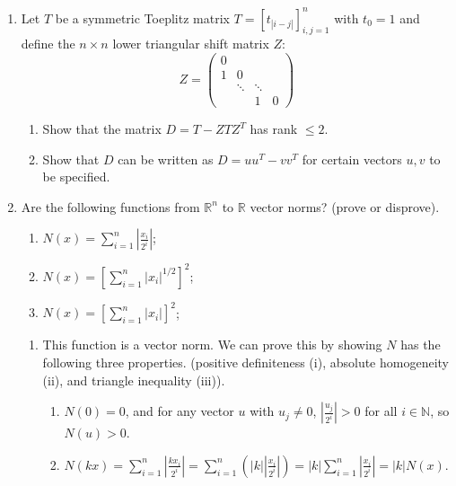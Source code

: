 \documentclass[11pt]{article}
\newcommand{\R}{\mathbb{R}}
\newcommand{\N}{\mathbb{N}}
\begin{document}
\begin{enumerate}
	\item Let \(T\) be a symmetric Toeplitz matrix \(T = [t_{|i-j|}]^n_{i,j=1}\) with \(t_0 = 1\) and define the \(n \times n\) lower triangular shift matrix \(Z\):
	      \[Z = \begin{pmatrix} 0 & & & \\ 1 & 0 & & \\ & \ddots & \ddots & \\ & & 1 & 0 \end{pmatrix}\]
	      \begin{enumerate}[label=(\alph*)]
		      \item Show that the matrix \(D = T - ZTZ^T\) has rank \(\leq 2\).
		      \item Show that \(D\) can be written as \(D = uu^T - vv^T\) for certain vectors \(u,v\) to be specified.
	      \end{enumerate}

	\item Are the following functions from \(\R^n\) to \(\R\) vector norms? (prove or disprove).
	      \begin{multicols}{3}
		      \begin{enumerate}[label=(\alph*)]
			      \item \(N(x) = \displaystyle\sum_{i=1}^n \left| \frac{x_i}{2^i} \right|\);
			      \item \(N(x) = \left[ \displaystyle\sum_{i=1}^n |x_i|^{1/2} \right]^2\);
			      \item \(N(x) = \left[ \displaystyle\sum_{i=1}^n |x_i| \right]^2\);
		      \end{enumerate}
	      \end{multicols}
	      \begin{enumerate}[label=(\alph*)]
		      \item This function is a vector norm.  We can prove this by showing \(N\) has the following three properties. (positive definiteness (i), absolute homogeneity (ii), and triangle inequality (iii)).
		            \begin{enumerate}
			            \item \(N(0)=0\), and for any vector \(u\) with \(u_j \neq 0\), \(\left| \displaystyle\frac{u_j}{2^i} \right| > 0\) for all \(i \in \N\), so \(N(u) > 0\).

			            \item \(N(kx) = \displaystyle\sum_{i=1}^{n} \left| \frac{kx_i}{2^i} \right| = \sum_{i=1}^n \left(|k|\left| \frac{x_i}{2^i} \right|\right) = |k| \sum_{i=1}^n \left| \frac{x_i}{2^i} \right| = |k|N(x)\).


\end{enumerate}
\end{enumerate}
\end{enumerate}
\end{document}

